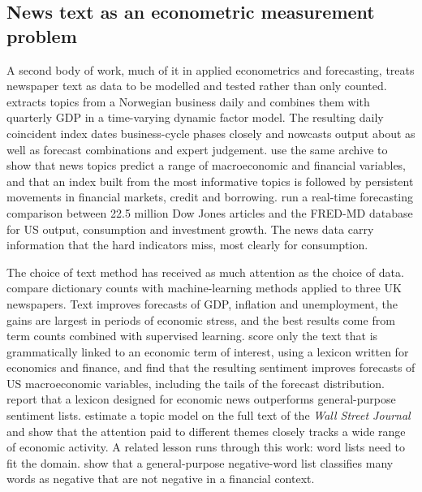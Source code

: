 \documentclass[12pt]{article}
\begin{document}
\subsection{News text as an econometric measurement problem}\label{sec:literature_text_econometrics}
A second body of work, much of it in applied econometrics and forecasting, treats newspaper text as data to be modelled and tested rather than only counted. \citet{thorsrud2020} extracts topics from a Norwegian business daily and combines them with quarterly GDP in a time-varying dynamic factor model. The resulting daily coincident index dates business-cycle phases closely and nowcasts output about as well as forecast combinations and expert judgement. \citet{larsen2019} use the same archive to show that news topics predict a range of macroeconomic and financial variables, and that an index built from the most informative topics is followed by persistent movements in financial markets, credit and borrowing. \citet{ellingsen2022} run a real-time forecasting comparison between 22.5 million Dow Jones articles and the FRED-MD database for US output, consumption and investment growth. The news data carry information that the hard indicators miss, most clearly for consumption.

The choice of text method has received as much attention as the choice of data. \citet{kalamara2022} compare dictionary counts with machine-learning methods applied to three UK newspapers. Text improves forecasts of GDP, inflation and unemployment, the gains are largest in periods of economic stress, and the best results come from term counts combined with supervised learning. \citet{barbaglia2023} score only the text that is grammatically linked to an economic term of interest, using a lexicon written for economics and finance, and find that the resulting sentiment improves forecasts of US macroeconomic variables, including the tails of the forecast distribution. \citet{shapiro2022} report that a lexicon designed for economic news outperforms general-purpose sentiment lists. \citet{bybee2024} estimate a topic model on the full text of the \textit{Wall Street Journal} and show that the attention paid to different themes closely tracks a wide range of economic activity. A related lesson runs through this work: word lists need to fit the domain. \citet{loughran2011} show that a general-purpose negative-word list classifies many words as negative that are not negative in a financial context.
\end{document}
